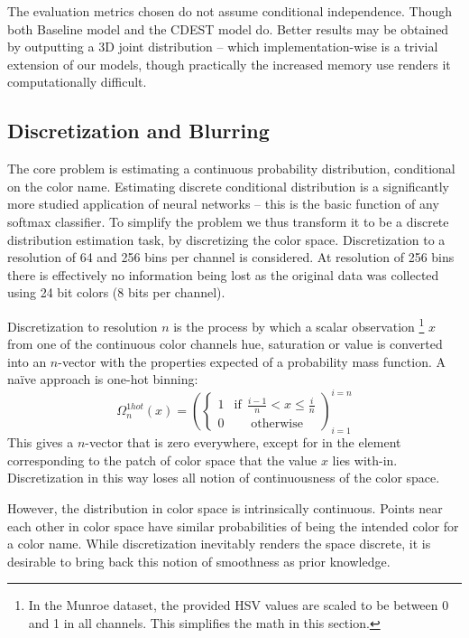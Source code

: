 \documentclass[11pt,letterpaper, twocolumn]{article}
\begin{document}
The evaluation metrics chosen do not assume conditional independence.
Though both Baseline model and the CDEST model do.
Better results may be obtained by outputting a 3D joint distribution -- which implementation-wise is a trivial extension of our models, 
though practically the increased memory use renders it computationally difficult.


\subsection{Discretization and Blurring}\label{sec:discretization-and-blurring}
The core problem is estimating a continuous  probability distribution, conditional on the color name.
Estimating discrete conditional distribution is a significantly more studied application of neural networks
-- this is the basic function of any softmax classifier.
To simplify the problem we thus transform it to be a discrete distribution estimation task, by discretizing the color space.
Discretization to a resolution of 64 and 256 bins per channel is considered.
At resolution of 256 bins there is effectively no information being lost as the original data was collected using 24 bit colors (8 bits per channel).


Discretization to resolution $n$ is the process by which a scalar observation%
\footnote{In the Munroe dataset, the provided HSV values are scaled to be between 0 and 1 in all channels. This simplifies the math in this section.}
 $x$
from one of the continuous color channels hue, saturation or value is converted into an $n$-vector with the properties expected of a probability mass function.
A na{\"i}ve approach is one-hot binning:
\[\Omega_{n}^{1hot}(x)=\left(\begin{cases}
1 & \mathrm{if}\:\:\frac{i-1}{n}<x\le\frac{i}{n}\\
0 & \:\:\:\:\:\:\mathrm{otherwise}
\end{cases}\right)_{i=1}^{i=n}
\]
This gives a $n$-vector that is zero everywhere, except for in the element corresponding to the patch of color space that the value $x$ lies with-in.
Discretization in this way loses all notion of continuousness of the color space.

However, the distribution in color space is intrinsically continuous.
Points near each other in color space have similar probabilities of being the intended color for a color name.
While discretization inevitably renders the space discrete, it is desirable to bring back this notion of smoothness as prior knowledge.
\end{document}
